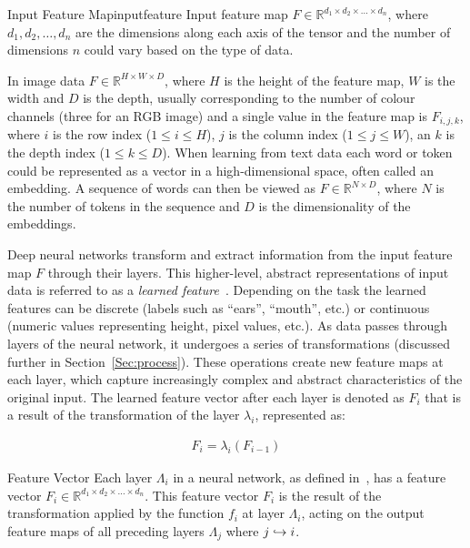 \begin{Definition}{Input Feature Map}{inputfeature}
Input feature map $F \in \mathbb{R}^{d_1 \times d_2 \times \ldots \times d_n}$, where $d_1, d_2, \ldots, d_n$ are the dimensions along each axis of the tensor and the number of dimensions $n$ could vary based on the type of data.
\end{Definition}

In image data $F \in \mathbb{R}^{H \times W \times D}$, where $H$ is the height of the feature map, $W$ is the width and $D$ is the depth, usually corresponding to the number of colour channels (\eg three for an RGB image) and a single value in the feature map is $F_{i, j, k}$, where $i$ is the row index ($1 \leq i \leq H$), $j$ is the column index ($1 \leq j \leq W$), an $k$ is the depth index ($1 \leq k \leq D$). When learning from text data each word or token could be represented as a vector in a high-dimensional space, often called an embedding. A sequence of words can then be viewed as $F \in \mathbb{R}^{N \times D}$, where $N$ is the number of tokens in the sequence and $D$ is the dimensionality of the embeddings.


Deep neural networks transform and extract information from the input feature map $F$ through their layers. This higher-level, abstract representations of input data is referred to as a \textit{learned feature}~\cite{hinton2006reducing}. Depending on the task the learned features can be discrete (\eg labels such as ``ears”, ``mouth”, etc.) or continuous (\eg numeric values representing height, pixel values, etc.). As data passes through layers of the neural network, it undergoes a series of transformations (discussed further in Section~\ref{Sec:process}). These operations create new feature maps at each layer, which capture increasingly complex and abstract characteristics of the original input. The learned feature vector after each layer is denoted as $F_i$ that is a result of the transformation of the layer $\lambda_i$, represented as:

\begin{eqnarray}
    F_i = \lambda_i(F_{i-1})
\end{eqnarray}


\begin{Definition}{Feature Vector}{}
Each layer \(\Lambda_i\) in a neural network, as defined in~, has a feature vector \(F_i \in \mathbb{R}^{d_1 \times d_2 \times \ldots \times d_n}\). This feature vector \(F_i\) is the result of the transformation applied by the function \(f_i\) at layer \(\Lambda_i\), acting on the output feature maps of all preceding layers \(\Lambda_j\) where \(j \hookrightarrow i\). 
\end{Definition}

